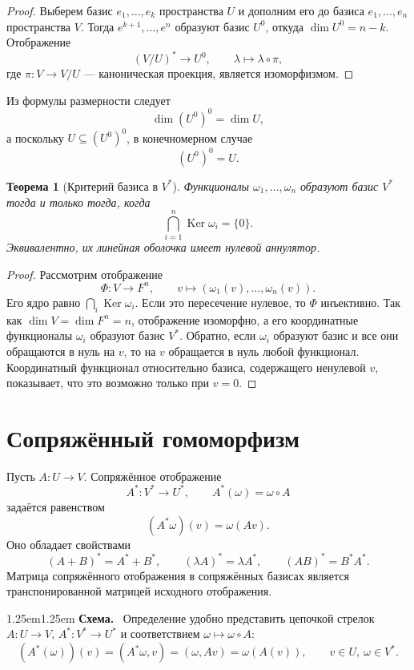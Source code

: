 \documentclass[12pt,a4paper,oneside,openany]{book}
\theoremstyle{definition}
\theoremstyle{plain}
\newtheorem{theorem}{Теорема}[chapter]
\theoremstyle{remark}
\newenvironment{visualreconstruction}
  {\begin{adjustwidth}{1.25em}{1.25em}\small
   \noindent\textcolor{logicgray}{\sffamily\bfseries Схема.}\ }
  {\par\end{adjustwidth}}
\DeclareMathOperator{\Ker}{Ker}
\begin{document}
\begin{proof}
Выберем базис $e_1,\ldots,e_k$ пространства $U$ и дополним его до
базиса $e_1,\ldots,e_n$ пространства $V$. Тогда
$e^{k+1},\ldots,e^n$ образуют базис $U^0$, откуда
$\dim U^0=n-k$. Отображение
\[
  (V/U)^*\to U^0,\qquad
  \lambda\mapsto\lambda\circ\pi,
\]
где $\pi\colon V\to V/U$ --- каноническая проекция, является
изоморфизмом.
\end{proof}


Из формулы размерности следует
\[
  \dim (U^0)^0=\dim U,
\]
а поскольку $U\subseteq(U^0)^0$, в конечномерном случае
\[
  (U^0)^0=U.
\]

\begin{theorem}[Критерий базиса в $V^*$]
Функционалы $\omega_1,\ldots,\omega_n$ образуют базис $V^*$ тогда и
только тогда, когда
\[
  \bigcap_{i=1}^{n}\Ker\omega_i=\{0\}.
\]
Эквивалентно, их линейная оболочка имеет нулевой аннулятор.
\end{theorem}

\begin{proof}
Рассмотрим отображение
\[
  \Phi\colon V\to F^n,\qquad
  v\mapsto(\omega_1(v),\ldots,\omega_n(v)).
\]
Его ядро равно $\bigcap_i\Ker\omega_i$. Если это пересечение нулевое,
то $\Phi$ инъективно. Так как $\dim V=\dim F^n=n$, отображение
изоморфно, а его координатные функционалы $\omega_i$ образуют базис
$V^*$. Обратно, если $\omega_i$ образуют базис и все они обращаются в
нуль на $v$, то на $v$ обращается в нуль любой функционал. Координатный
функционал относительно базиса, содержащего ненулевой $v$, показывает,
что это возможно только при $v=0$.
\end{proof}

\section{Сопряжённый гомоморфизм}

Пусть $A\colon U\to V$. Сопряжённое отображение
\[
  A^*\colon V^*\to U^*,
  \qquad
  A^*(\omega)=\omega\circ A
\]
задаётся равенством
\[
  (A^*\omega)(v)=\omega(Av).
\]
Оно обладает свойствами
\[
  (A+B)^*=A^*+B^*,
  \qquad (\lambda A)^*=\lambda A^*,
  \qquad (AB)^*=B^*A^*.
\]
Матрица сопряжённого отображения в сопряжённых базисах является
транспонированной матрицей исходного отображения.

\begin{visualreconstruction}
Определение удобно представить цепочкой стрелок
$A\colon U\to V$, $A^*\colon V^*\to U^*$ и соответствием
$\omega\mapsto\omega\circ A$:
\[
  (A^*(\omega))(v)=(A^*\omega,v)=(\omega,Av)
  =\omega(A(v)),
  \qquad v\in U,\ \omega\in V^*.
\]
\end{visualreconstruction}
\end{document}
